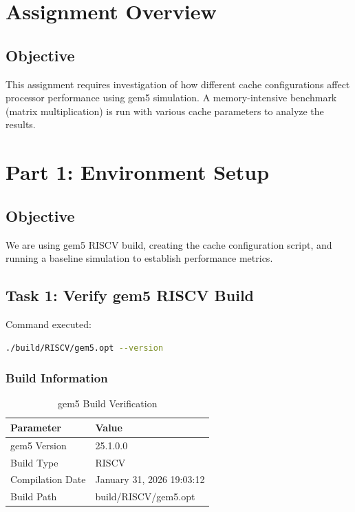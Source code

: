 \documentclass[11pt,a4paper]{article}
\begin{document}
\newpage
\tableofcontents
\newpage

\section{Assignment Overview}

\subsection{Objective}
This assignment requires investigation of how different cache configurations affect processor performance using gem5 simulation. A memory-intensive benchmark (matrix multiplication) is run with various cache parameters to analyze the results.

\section{Part 1: Environment Setup}

\subsection{Objective}
We are using gem5 RISCV build, creating the cache configuration script, and running a baseline simulation to establish performance metrics.

\subsection{Task 1: Verify gem5 RISCV Build}

Command executed:
\begin{lstlisting}[language=bash]
./build/RISCV/gem5.opt --version
\end{lstlisting}

\subsubsection{Build Information}

\begin{table}[H]
\centering
\caption{gem5 Build Verification}
\begin{tabular}{ll}
\toprule
\textbf{Parameter} & \textbf{Value} \\
\midrule
gem5 Version & 25.1.0.0 \\
Build Type & RISCV \\
Compilation Date & January 31, 2026 19:03:12 \\
Build Path & build/RISCV/gem5.opt \\
\bottomrule
\end{tabular}
\end{table}
\end{document}
